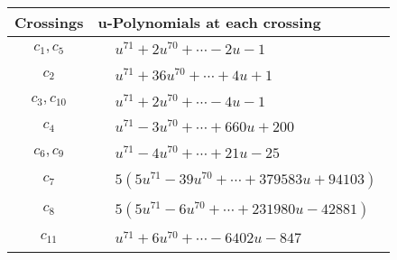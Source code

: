 \documentclass[1p]{elsarticle_modified}
\theoremstyle{definition}
\begin{document}
\begin{tabular}{m{50pt}|m{274pt}}
Crossings & \hspace{64pt}u-Polynomials at each crossing \\
\hline $$\begin{aligned}c_{1},c_{5}\end{aligned}$$&$\begin{aligned}
&u^{71}+2 u^{70}+\cdots-2 u-1
\end{aligned}$\\
\hline $$\begin{aligned}c_{2}\end{aligned}$$&$\begin{aligned}
&u^{71}+36 u^{70}+\cdots+4 u+1
\end{aligned}$\\
\hline $$\begin{aligned}c_{3},c_{10}\end{aligned}$$&$\begin{aligned}
&u^{71}+2 u^{70}+\cdots-4 u-1
\end{aligned}$\\
\hline $$\begin{aligned}c_{4}\end{aligned}$$&$\begin{aligned}
&u^{71}-3 u^{70}+\cdots+660 u+200
\end{aligned}$\\
\hline $$\begin{aligned}c_{6},c_{9}\end{aligned}$$&$\begin{aligned}
&u^{71}-4 u^{70}+\cdots+21 u-25
\end{aligned}$\\
\hline $$\begin{aligned}c_{7}\end{aligned}$$&$\begin{aligned}
&5(5 u^{71}-39 u^{70}+\cdots+379583 u+94103)
\end{aligned}$\\
\hline $$\begin{aligned}c_{8}\end{aligned}$$&$\begin{aligned}
&5(5 u^{71}-6 u^{70}+\cdots+231980 u-42881)
\end{aligned}$\\
\hline $$\begin{aligned}c_{11}\end{aligned}$$&$\begin{aligned}
&u^{71}+6 u^{70}+\cdots-6402 u-847
\end{aligned}$\\
\hline
\end{tabular}\\~\\
\end{document}
